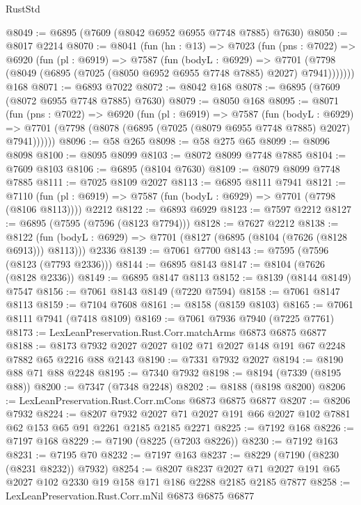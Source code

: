 \begin{lexlean}{RustStd}
\begin{coremodule}
@8049 := @6895 (@7609 (@8042 @6952 @6955 @7748 @7885) @7630)
@8050 := @8017 @2214
@8070 := @8041
    (fun (hn : @13) =>
    @7023
      (fun (pns : @7022) =>
      @6920
        (fun (pl : @6919) =>
        @7587
          (fun (bodyL : @6929) =>
          @7701 (@7798 (@8049 (@6895 (@7025 (@8050 @6952 @6955 @7748 @7885) @2027) @7941)))))))
    @168
@8071 := @6893 @7022
@8072 := @8042 @168
@8078 := @6895 (@7609 (@8072 @6955 @7748 @7885) @7630)
@8079 := @8050 @168
@8095 := @8071
    (fun (pns : @7022) =>
    @6920
      (fun (pl : @6919) =>
      @7587
        (fun (bodyL : @6929) =>
        @7701 (@7798 (@8078 (@6895 (@7025 (@8079 @6955 @7748 @7885) @2027) @7941))))))
@8096 := @58 @265
@8098 := @58 @275 @65
@8099 := @8096 @8098
@8100 := @8095 @8099
@8103 := @8072 @8099 @7748 @7885
@8104 := @7609 @8103
@8106 := @6895 (@8104 @7630)
@8109 := @8079 @8099 @7748 @7885
@8111 := @7025 @8109 @2027
@8113 := @6895 @8111 @7941
@8121 := @7110
    (fun (pl : @6919) => @7587 (fun (bodyL : @6929) => @7701 (@7798 (@8106 @8113))))
    @2212
@8122 := @6893 @6929
@8123 := @7597 @2212
@8127 := @6895 (@7595 (@7596 (@8123 @7794)))
@8128 := @7627 @2212
@8138 := @8122
    (fun (bodyL : @6929) => @7701 (@8127 (@6895 (@8104 (@7626 (@8128 @6913))) @8113)))
    @2336
@8139 := @7061 @7700
@8143 := @7595 (@7596 (@8123 (@7793 @2336)))
@8144 := @6895 @8143
@8147 := @8104 (@7626 (@8128 @2336))
@8149 := @6895 @8147 @8113
@8152 := @8139 (@8144 @8149) @7547
@8156 := @7061 @8143 @8149 (@7220 @7594)
@8158 := @7061 @8147 @8113
@8159 := @7104 @7608
@8161 := @8158 (@8159 @8103)
@8165 := @7061 @8111 @7941 (@7418 @8109)
@8169 := @7061 @7936 @7940 (@7225 @7761)
@8173 := LexLeanPreservation.Rust.Corr.matchArms @6873 @6875 @6877
@8188 := @8173 @7932 @2027 @2027 @102 @71 @2027 @148 @191 @67 @2248 @7882 @65 @2216 @88 @2143
@8190 := @7331 @7932 @2027
@8194 := @8190 @88 @71 @88 @2248
@8195 := @7340 @7932
@8198 := @8194 (@7339 (@8195 @88))
@8200 := @7347 (@7348 @2248)
@8202 := @8188 (@8198 @8200)
@8206 := LexLeanPreservation.Rust.Corr.mCons @6873 @6875 @6877
@8207 := @8206 @7932
@8224 := @8207
    @7932
    @2027
    @71
    @2027
    @191
    @66
    @2027
    @102
    @7881
    @62
    @153
    @65
    @91
    @2261
    @2185
    @2185
    @2271
@8225 := @7192 @168
@8226 := @7197 @168
@8229 := @7190 (@8225 (@7203 @8226))
@8230 := @7192 @163
@8231 := @7195 @70
@8232 := @7197 @163
@8237 := @8229 (@7190 (@8230 (@8231 @8232)) @7932)
@8254 := @8207
    @8237
    @2027
    @71
    @2027
    @191
    @65
    @2027
    @102
    @2330
    @19
    @158
    @171
    @186
    @2288
    @2185
    @2185
    @7877
@8258 := LexLeanPreservation.Rust.Corr.mNil @6873 @6875 @6877

\end{coremodule}
\end{lexlean}
